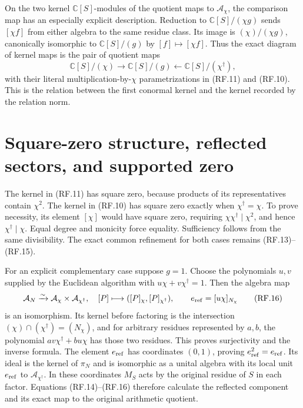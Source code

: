 \documentclass[11pt]{article}
\newcommand{\C}{\mathbb C}
\newcommand{\A}{\mathcal A}
\begin{document}
On the two kernel $\C[S]$-modules of the quotient maps to $\A_\chi$,
the comparison map has
an especially explicit description. Reduction to $\C[S]/(\chi g)$
sends $[\chi f]$ from either algebra to the same residue class.
Its image is $(\chi)/(\chi g)$, canonically isomorphic to
$\C[S]/(g)$ by $[f]\mapsto[\chi f]$. Thus the exact diagram of
kernel maps is the pair of quotient maps
\[
 \C[S]/(\chi)\longrightarrow\C[S]/(g)
 \longleftarrow\C[S]/(\chi^\dagger),
 \tag{RF.15}
\]
with their literal multiplication-by-$\chi$ parametrizations in
(RF.11) and (RF.10). This is the relation between the first
conormal kernel and the kernel recorded by the relation norm.

\section{Square-zero structure, reflected sectors, and supported zero}

The kernel in (RF.11) has square zero, because products of its
representatives contain $\chi^2$. The kernel in (RF.10) has square
zero exactly when $\chi^\dagger=\chi$. To prove necessity, its
element $[\chi]$ would have square zero, requiring
$\chi\chi^\dagger\mid\chi^2$, and hence
$\chi^\dagger\mid\chi$. Equal degree and monicity force equality.
Sufficiency follows from the same divisibility. The exact common
refinement for both cases remains (RF.13)--(RF.15).

For an explicit complementary case suppose $g=1$. Choose the
polynomials $u,v$ supplied by the Euclidean algorithm with
$u\chi+v\chi^\dagger=1$. Then the algebra map
\[
 \A_N\xrightarrow{\sim}\A_\chi\times\A_{\chi^\dagger},
 \quad[P]\longmapsto([P]_{\chi},[P]_{\chi^\dagger}),
 \qquad e_{\rm ref}=[u\chi]_{N_\chi}
 \tag{RF.16}
\]
is an isomorphism. Its kernel before factoring is the intersection
$(\chi)\cap(\chi^\dagger)=(N_\chi)$, and for arbitrary residues
represented by $a,b$, the polynomial
$a v\chi^\dagger+b u\chi$ has those two residues. This proves
surjectivity and the inverse formula. The element $e_{\rm ref}$
has coordinates $(0,1)$, proving $e_{\rm ref}^2=e_{\rm ref}$.
Its ideal is the kernel of $\pi_N$ and is isomorphic as a unital
algebra with its local unit $e_{\rm ref}$ to
$\A_{\chi^\dagger}$. In these coordinates $M_S$ acts by the
original residue of $S$ in each factor. Equations (RF.14)--(RF.16)
therefore calculate the reflected component and its exact map to
the original arithmetic quotient.
\end{document}
